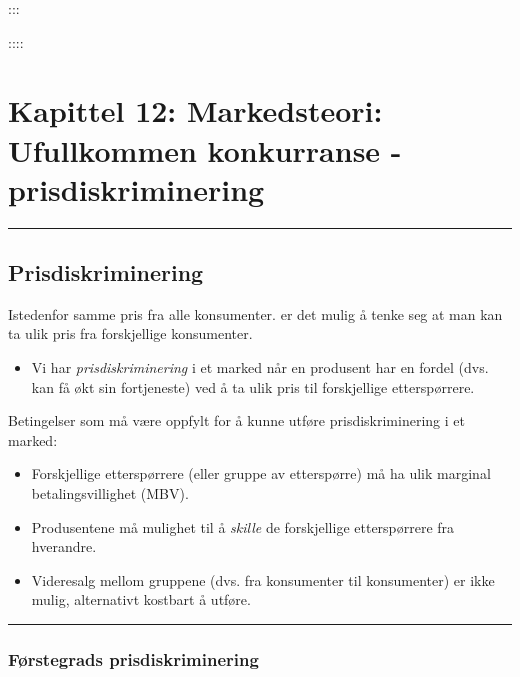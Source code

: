 \documentclass[
  letterpaper,
  DIV=11,
  numbers=noendperiod]{scrartcl}
\providecommand{\tightlist}{%
  \setlength{\itemsep}{0pt}\setlength{\parskip}{0pt}}\usepackage{longtable,booktabs,array}
\begin{document}
:::

::::

\section{Kapittel 12: Markedsteori: Ufullkommen konkurranse -
prisdiskriminering}\label{kapittel-12-markedsteori-ufullkommen-konkurranse---prisdiskriminering}

\begin{center}\rule{0.5\linewidth}{0.5pt}\end{center}

\subsection{Prisdiskriminering}\label{prisdiskriminering}

Istedenfor samme pris fra alle konsumenter. er det mulig å tenke seg at
man kan ta ulik pris fra forskjellige konsumenter.

\begin{itemize}
\tightlist
\item
  Vi har \emph{prisdiskriminering} i et marked når en produsent har en
  fordel (dvs. kan få økt sin fortjeneste) ved å ta ulik pris til
  forskjellige etterspørrere.
\end{itemize}

Betingelser som må være oppfylt for å kunne utføre prisdiskriminering i
et marked:

\begin{itemize}
\tightlist
\item
  Forskjellige etterspørrere (eller gruppe av etterspørre) må ha ulik
  marginal betalingsvillighet (MBV).
\item
  Produsentene må mulighet til å \emph{skille} de forskjellige
  etterspørrere fra hverandre.
\item
  Videresalg mellom gruppene (dvs. fra konsumenter til konsumenter) er
  ikke mulig, alternativt kostbart å utføre.
\end{itemize}

\begin{center}\rule{0.5\linewidth}{0.5pt}\end{center}

\subsubsection{Førstegrads
prisdiskriminering}\label{fuxf8rstegrads-prisdiskriminering}
\end{document}
